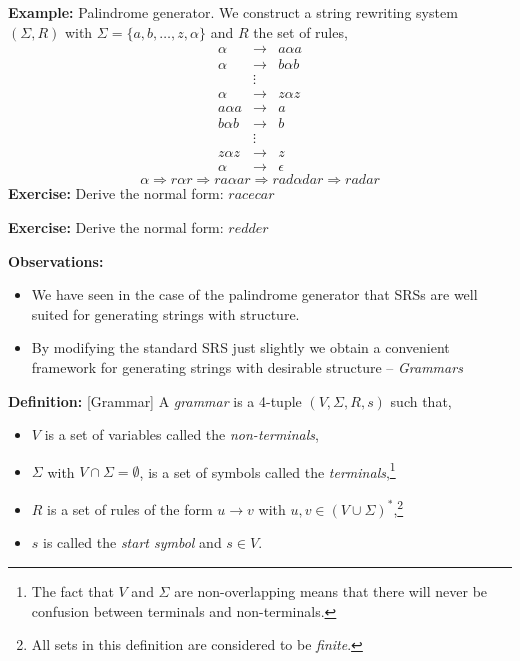 \documentclass[a4paper,blends,pdf,colorBG,slideColor]{prosper}
\begin{document}
\small
{\bf Example:} Palindrome generator.  We construct a string rewriting system $(\Sigma,R)$ with
$\Sigma = \{a,b,\ldots,z, \alpha\}$ and $R$ the set of rules,
\[
\begin{array}{rcl}
\alpha & \rightarrow & a \alpha a\\
\alpha & \rightarrow & b \alpha b\\
& \vdots&\\
\alpha &\rightarrow& z \alpha z\\
a\alpha a & \rightarrow & a\\
b\alpha b & \rightarrow & b\\
& \vdots&\\
z\alpha z & \rightarrow & z\\
\alpha &\rightarrow& \epsilon
\end{array}
\]
\vspace{.1in}
\[
\alpha \Rightarrow r \alpha r \Rightarrow r a \alpha a r \Rightarrow r a d \alpha d a r \Rightarrow r a d a r
\]
{\bf Exercise:} Derive the normal form: $racecar$

{\bf Exercise:} Derive the normal form: $redder$

\es



\small
{\bf Observations:}
\begin{itemize}
\item We have seen in the case of the palindrome generator that SRSs are well suited for generating strings with 
structure.
\item By modifying the standard SRS just slightly we obtain a convenient framework for generating strings
with desirable structure -- {\em Grammars}
\end{itemize}

\vspace{.2in}

{\bf Definition:} [Grammar] A {\em grammar} is a 4-tuple $(V,\Sigma,R,s)$ such that,
\begin{itemize}
\item $V$ is a set of variables called the {\em non-terminals},
\item $\Sigma$ with $V\cap \Sigma = \emptyset$,  is a set of symbols called the {\em terminals},\footnote{The fact that $V$ and $\Sigma$ are non-overlapping means
that there will never be confusion between terminals and non-terminals.}
\item $R$ is a set of rules of the form $u \rightarrow v$ with $u,v\in(V\cup \Sigma)^*$,\footnote{All sets in this definition
are considered to be {\em finite}.}
\item $s$ is called the {\em start symbol} and $s\in V$.
\end{itemize}
\es
\end{document}
